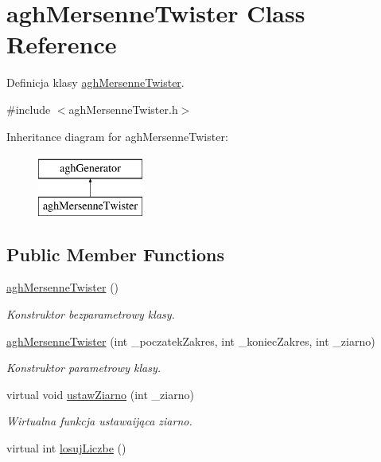 \hypertarget{classaghMersenneTwister}{\section{agh\-Mersenne\-Twister \-Class \-Reference}
\label{classaghMersenneTwister}
}


\-Definicja klasy \hyperlink{classaghMersenneTwister}{agh\-Mersenne\-Twister}.  




{\ttfamily \#include $<$agh\-Mersenne\-Twister.\-h$>$}

\-Inheritance diagram for agh\-Mersenne\-Twister\-:\begin{figure}[H]
\begin{center}
\leavevmode
\includegraphics[height=2.000000cm]{classaghMersenneTwister}
\end{center}
\end{figure}
\subsection*{\-Public \-Member \-Functions}
\begin{DoxyCompactItemize}
\item 
\hypertarget{classaghMersenneTwister_a51589fc19681ec088c608cbf4b7a7ed5}{\hyperlink{classaghMersenneTwister_a51589fc19681ec088c608cbf4b7a7ed5}{agh\-Mersenne\-Twister} ()}\label{classaghMersenneTwister_a51589fc19681ec088c608cbf4b7a7ed5}

\begin{DoxyCompactList}\small\item\em \-Konstruktor bezparametrowy klasy. \end{DoxyCompactList}\item 
\hyperlink{classaghMersenneTwister_afc8d9cd5414df5fc737aaa118f3b8d47}{agh\-Mersenne\-Twister} (int \-\_\-poczatek\-Zakres, int \-\_\-koniec\-Zakres, int \-\_\-ziarno)
\begin{DoxyCompactList}\small\item\em \-Konstruktor parametrowy klasy. \end{DoxyCompactList}\item 
virtual void \hyperlink{classaghMersenneTwister_aadb2ebbce4d8efdb3de835b1e5e17189}{ustaw\-Ziarno} (int \-\_\-ziarno)
\begin{DoxyCompactList}\small\item\em \-Wirtualna funkcja ustawaijąca ziarno. \end{DoxyCompactList}\item 
virtual int \hyperlink{classaghMersenneTwister_a28d9c9f0008890376688bb49b81a2071}{losuj\-Liczbe} ()
\end{DoxyCompactItemize}


